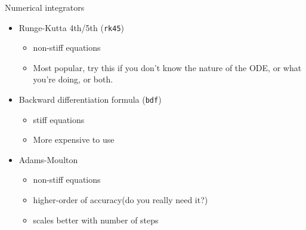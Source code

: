 \documentclass[presentation]{beamer}
\begin{document}
\begin{frame}[fragile,label={sec:org5783e9d}]{Numerical integrators}
 \begin{itemize}
\item Runge-Kutta 4th/5th (\texttt{rk45})
\begin{itemize}
\item non-stiff equations
\item Most popular, try this if you don't know the nature of the ODE, or what you're doing, or both.
\end{itemize}
\item Backward differentiation formula (\texttt{bdf})
\begin{itemize}
\item stiff equations
\item More expensive to use
\end{itemize}
\item Adams-Moulton
\begin{itemize}
\item non-stiff equations
\item higher-order of accuracy(do you really need it?)
\item scales better with number of steps
\end{itemize}
\end{itemize}
\end{frame}
\end{document}
